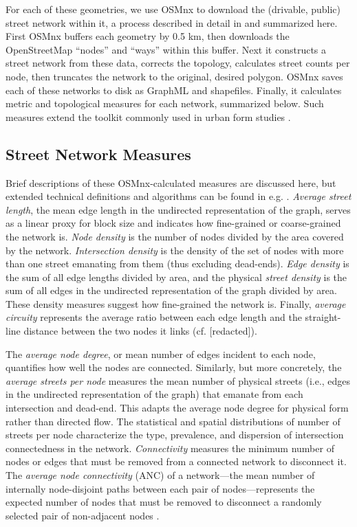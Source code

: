 \documentclass[Afour,sageh,times]{sagej}
\renewcommand{\cite}{\citep}
\begin{document}
For each of these geometries, we use OSMnx to download the (drivable, public) street network within it, a process described in detail in \cite{redacted_osmnx:_2017} and summarized here. First OSMnx buffers each geometry by 0.5 km, then downloads the OpenStreetMap \enquote{nodes} and \enquote{ways} within this buffer. Next it constructs a street network from these data, corrects the topology, calculates street counts per node, then truncates the network to the original, desired polygon. OSMnx saves each of these networks to disk as GraphML and shapefiles. Finally, it calculates metric and topological measures for each network, summarized below. Such measures extend the toolkit commonly used in urban form studies \cite{talen_measuring_2003, ewing_travel_2010}.

\subsection{Street Network Measures}

Brief descriptions of these OSMnx-calculated measures are discussed here, but extended technical definitions and algorithms can be found in e.g. \cite{trudeau_introduction_1994, albert_statistical_2002, dorogovtsev_evolution_2002, brandes_network_2005, costa_characterization_2007, newman_structure_2003, newman_networks:_2010, barthelemy_spatial_2011, cranmer_navigating_2017}. \emph{Average street length}, the mean edge length in the undirected representation of the graph, serves as a linear proxy for block size and indicates how fine-grained or coarse-grained the network is. \emph{Node density} is the number of nodes divided by the area covered by the network. \emph{Intersection density} is the density of the set of nodes with more than one street emanating from them (thus excluding dead-ends). \emph{Edge density} is the sum of all edge lengths divided by area, and the physical \emph{street density} is the sum of all edges in the undirected representation of the graph divided by area. These density measures suggest how fine-grained the network is. Finally, \emph{average circuity} represents the average ratio between each edge length and the straight-line distance between the two nodes it links (cf. [redacted]).

The \emph{average node degree}, or mean number of edges incident to each node, quantifies how well the nodes are connected. Similarly, but more concretely, the \emph{average streets per node} measures the mean number of physical streets (i.e., edges in the undirected representation of the graph) that emanate from each intersection and dead-end. This adapts the average node degree for physical form rather than directed flow. The statistical and spatial distributions of number of streets per node characterize the type, prevalence, and dispersion of intersection connectedness in the network. \emph{Connectivity} measures the minimum number of nodes or edges that must be removed from a connected network to disconnect it. The \emph{average node connectivity} (ANC) of a network---the mean number of internally node-disjoint paths between each pair of nodes---represents the expected number of nodes that must be removed to disconnect a randomly selected pair of non-adjacent nodes \cite{beineke_average_2002,dankelmann_bounds_2003}. 
\end{document}

